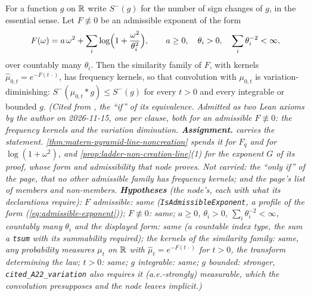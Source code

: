 \begin{theorem}
\label{thm:cited-A22}
\leanok
For a function $g$ on $\mathbb{R}$ write $S^-(g)$ for the number of sign changes of $g$, in the essential
sense.
Let $F \not\equiv 0$ be an admissible exponent of the form
\[
  F(\omega) = a\,\omega^2 + \sum_i\log\Bigl(1 + \frac{\omega^2}{\theta_i^2}\Bigr), \qquad
  a \ge 0,\quad \theta_i > 0,\quad \sum_i\theta_i^{-2} < \infty,
\]
over countably many $\theta_i$. Then the similarity family of $F$, with kernels
$\widehat\mu_{0,t} = e^{-F(t\,\cdot)}$, has \Polya{} frequency kernels, so that convolution with
$\mu_{0,t}$ is variation-diminishing: $S^-(\mu_{0,t} * g) \le S^-(g)$ for every $t > 0$ and every
integrable or bounded $g$.
\statusA\quad{}\quad\emph{(Cited from , the
``if'' of its equivalence. Admitted as two Lean axioms by the author on 2026-11-15, one per
clause, both for an admissible $F \not\equiv 0$: the \Polya{} frequency kernels and the variation
diminution. \textbf{Assignment.}  carries the statement. \ref{thm:matern-pyramid-line-noncreation}
spends it for $F_q$ and for $\log(1 + \omega^2)$, and \ref{prop:ladder-non-creation-line}(1) for
the exponent $G$ of its proof, whose form and admissibility that node proves. Not carried: the
``only if'' of the page, that no other admissible family has \Polya{} frequency kernels; and the
page's list of members and non-members.
\textbf{Hypotheses} (the node's, each with what its declarations require): $F$ admissible: same
(\texttt{IsAdmissibleExponent}, a profile of the form (\ref{eq:admissible-exponent})); $F \not\equiv 0$:
same; $a \ge 0$, $\theta_i > 0$, $\sum_i\theta_i^{-2} < \infty$, countably many $\theta_i$ and the
displayed form: same (a countable index type, the sum a \texttt{tsum} with its summability required);
the kernels of the similarity family: same, any probability measures $\mu_t$ on $\mathbb{R}$ with
$\widehat\mu_t = e^{-F(t\,\cdot)}$ for $t > 0$, the transform determining the law; $t > 0$: same;
$g$ integrable: same; $g$ bounded: stronger, \texttt{cited\_A22\_variation} also requires it
(a.e.-strongly) measurable, which the convolution presupposes and the node leaves implicit.)}
\end{theorem}

